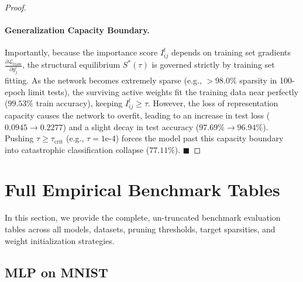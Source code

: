 \begin{proof}
\paragraph{Generalization Capacity Boundary.} Importantly, because the importance score $I_{ij}^l$ depends on training set gradients $\frac{\partial \mathcal{L}_{\text{train}}}{\partial y_j^l}$, the structural equilibrium $S^*(\tau)$ is governed strictly by training set fitting. As the network becomes extremely sparse (e.g., $>98.0\%$ sparsity in 100-epoch limit tests), the surviving active weights fit the training data near perfectly ($99.53\%$ train accuracy), keeping $I_{ij}^l \ge \tau$. However, the loss of representation capacity causes the network to overfit, leading to an increase in test loss ($0.0945 \to 0.2277$) and a slight decay in test accuracy ($97.69\% \to 96.94\%$). Pushing $\tau \ge \tau_{\text{crit}}$ (e.g., $\tau = 1\text{e-}4$) forces the model past this capacity boundary into catastrophic classification collapse ($77.11\%$). $\blacksquare$
\end{proof}


\clearpage
\section{Full Empirical Benchmark Tables}
\label{sec:appendix_full_tables}

In this section, we provide the complete, un-truncated benchmark evaluation tables across all models, datasets, pruning thresholds, target sparsities, and weight initialization strategies.

\subsection{MLP on MNIST}

